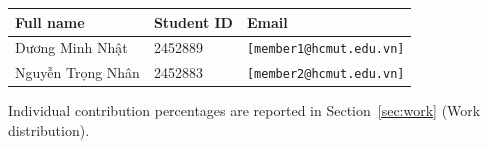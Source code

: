 \begin{table}[H]
\centering
\begin{tabular}{@{}lll@{}}
\toprule
Full name & Student ID & Email \\
\midrule
Dương Minh Nhật & 2452889 & \texttt{[member1@hcmut.edu.vn]} \\
Nguyễn Trọng Nhân & 2452883 & \texttt{[member2@hcmut.edu.vn]} \\
\bottomrule
\end{tabular}
\end{table}

Individual contribution percentages are reported in Section~\ref{sec:work} (Work distribution).
